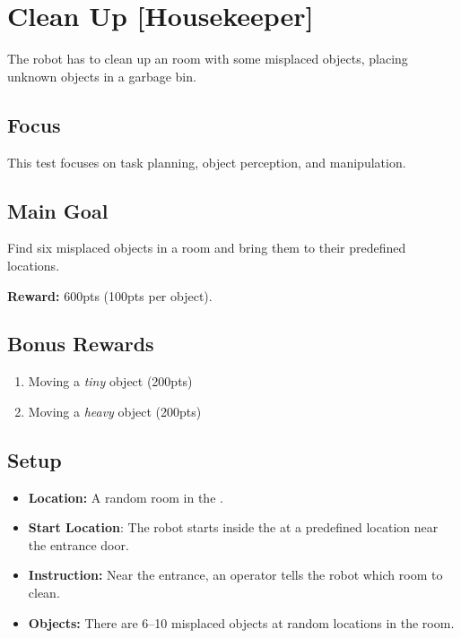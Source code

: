 \section{Clean Up [Housekeeper]}
\label{test:clean-up}

The robot has to clean up an \Arena{} room with some misplaced objects, placing unknown objects in a garbage bin.

\subsection*{Focus}
This test focuses on task planning, object perception, and manipulation.

\subsection*{Main Goal}
Find six misplaced objects in a room and bring them to their predefined locations.

\noindent\textbf{Reward:} 600pts (100pts per object).

\subsection*{Bonus Rewards}
\begin{enumerate}[nosep]
	\item Moving a \emph{tiny} object (200pts)
	\item Moving a \emph{heavy} object (200pts)
\end{enumerate}


\subsection*{Setup}
\begin{itemize}[nosep]
	\item \textbf{Location:} A random room in the \Arena{}.
	\item \textbf{Start Location}: The robot starts inside the \Arena{} at a predefined location near the entrance door.
	\item \textbf{Instruction:} Near the entrance, an operator tells the robot which room to clean.
	\item \textbf{Objects:} There are 6--10 misplaced objects at random locations in the room.
\end{itemize}

